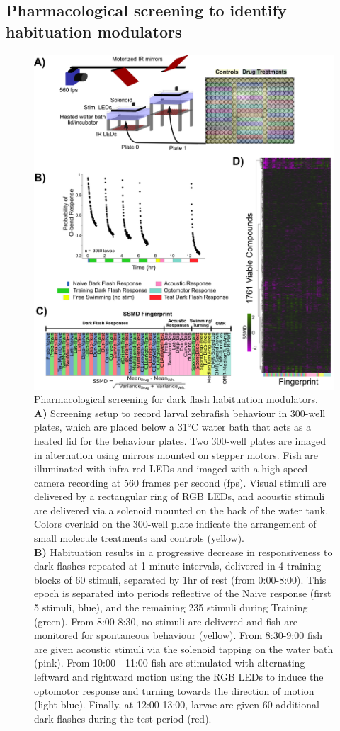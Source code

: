 \documentclass[9pt,lineno]{RandlettLab_elife}
\begin{document}
\subsection{Pharmacological screening to identify habituation modulators}
\vspace{3mm}

\begin{figure}
\begin{fullwidth}
\begin{center}

\includegraphics[width=0.77\linewidth]{Figure3 - ScreenSetup.png}
\caption{Pharmacological screening for dark flash habituation modulators. 
\\ \textbf{A)} Screening setup to record larval zebrafish behaviour in 300-well plates, which are placed below a 31°C water bath that acts as a heated lid for the behaviour plates. Two 300-well plates are imaged in alternation using mirrors mounted on stepper motors. Fish are illuminated with infra-red LEDs and imaged with a high-speed camera recording at 560 frames per second (fps). Visual stimuli are delivered by a rectangular ring of RGB LEDs, and acoustic stimuli are delivered via a solenoid mounted on the back of the water tank. Colors overlaid on the 300-well plate indicate the arrangement of small molecule treatments and controls (yellow). 
\\ \textbf{B)} Habituation results in a progressive decrease in responsiveness to dark flashes repeated at 1-minute intervals, delivered in 4 training blocks of 60 stimuli, separated by 1hr of rest (from 0:00-8:00). This epoch is separated into periods reflective of the Naive response (first 5 stimuli, blue), and the remaining 235 stimuli during Training (green). From 8:00-8:30, no stimuli are delivered and fish are monitored for spontaneous behaviour (yellow). From 8:30-9:00 fish are given acoustic stimuli via the solenoid tapping on the water bath (pink). From 10:00 - 11:00 fish are stimulated with alternating leftward and rightward motion using the RGB LEDs to induce the optomotor response and turning towards the direction of motion (light blue). Finally, at 12:00-13:00, larvae are given 60 additional dark flashes during the test period (red). 
}
\end{center}
\end{fullwidth}
\end{figure}
\end{document}

